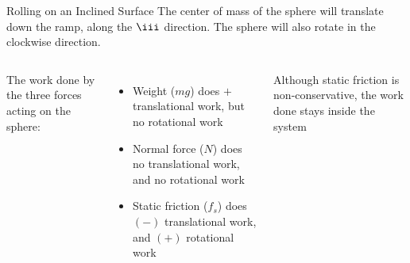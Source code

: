 \documentclass[12pt,compress,aspectratio=169]{beamer}
\begin{document}
\begin{frame}{Rolling on an Inclined Surface}
  The center of mass of the sphere will translate down the ramp, along the
  $\iii$ direction. The sphere will also rotate in the clockwise direction.

  \vspace{.2in}
  \begin{columns}

    The work done by the three forces acting on the sphere:
    \begin{itemize}
    \item Weight ($mg$) does $+$ translational work, but no rotational
      work
    \item Normal force ($N$) does no translational work, and no rotational
      work
    \item Static friction ($f_s$) does $(-)$ translational work, and $(+)$
      rotational work
    \end{itemize}
    Although static friction is non-conservative, the work done stays inside
    the system
  \end{columns}    
\end{frame}
\end{document}
